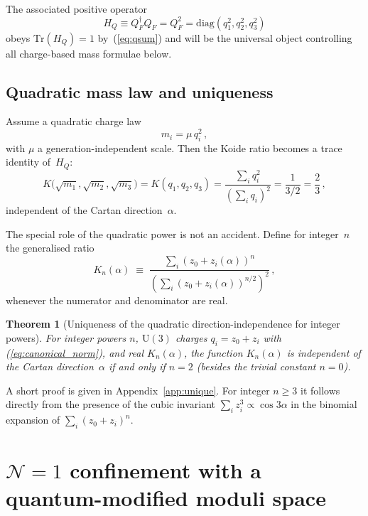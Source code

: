 \documentclass[11pt,a4paper]{article}
\newtheorem{theorem}{Theorem}
\newcommand{\UU}{\mathrm{U}}
\newcommand{\Tr}{\mathrm{Tr}}
\newcommand{\diag}{\mathrm{diag}}
\begin{document}
The associated positive operator
\begin{equation}
  H_Q\equiv Q_F^\dagger Q_F = Q_F^2 = \diag(q_1^2,q_2^2,q_3^2)
  \label{eq:HQ}
\end{equation}
obeys $\Tr(H_Q)=1$ by~(\ref{eq:qsum}) and will be the universal object
controlling all charge-based mass formulae below.

\subsection{Quadratic mass law and uniqueness}
\label{sec:unique}

Assume a quadratic charge law
\begin{equation}
  m_i=\mu\,q_i^2\,,
  \label{eq:mi_quad}
\end{equation}
with $\mu$ a generation-independent scale.
Then the Koide ratio becomes a trace identity of~$H_Q$:
\begin{equation}
  K\bigl(\sqrt{m_1},\sqrt{m_2},\sqrt{m_3}\bigr)
  = K(q_1,q_2,q_3)
  = \frac{\sum_i q_i^2}{(\sum_i q_i)^2}
  = \frac{1}{3/2}
  = \frac{2}{3}\,,
  \label{eq:K_trace_id}
\end{equation}
independent of the Cartan direction~$\alpha$.

The special role of the quadratic power is not an accident.
Define for integer~$n$ the generalised ratio
\begin{equation}
  K_n(\alpha)
  \;\equiv\;
  \frac{\sum_i (z_0+z_i(\alpha))^n}{\left(\sum_i (z_0+z_i(\alpha))^{n/2}\right)^2}\,,
  \label{eq:Kn_def}
\end{equation}
whenever the numerator and denominator are real.

\begin{theorem}[Uniqueness of the quadratic direction-independence for integer powers]
\label{thm:unique_n2}
  For integer powers $n$, $\UU(3)$ charges $q_i=z_0+z_i$ with
  (\ref{eq:canonical_norm}), and real $K_n(\alpha)$, the function
  $K_n(\alpha)$ is independent of the Cartan direction~$\alpha$
  if and only if $n=2$ (besides the trivial constant $n=0$).
\end{theorem}

\noindent A short proof is given in Appendix~\ref{app:unique}.
For integer $n\ge3$ it follows directly from the presence of the cubic
invariant $\sum_i z_i^3\propto\cos 3\alpha$ in the binomial expansion of
$\sum_i (z_0+z_i)^n$.

\section{\texorpdfstring{$\mathcal{N}{=}1$}{N=1} confinement with a quantum-modified moduli space}
\label{sec:seiberg}
\end{document}
